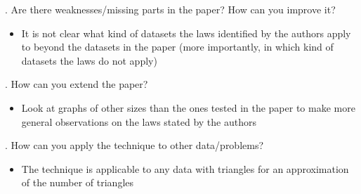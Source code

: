 \documentclass[12pt]{article}
\begin{document}
. Are there weaknesses/missing parts in the paper? How can you improve it?

\begin{itemize}
    \item It is not clear what kind of datasets the laws identified by the authors apply to beyond the datasets in the paper (more importantly, in which kind of datasets the laws do not apply)
\end{itemize}

. How can you extend the paper?

\begin{itemize}
    \item Look at graphs of other sizes than the ones tested in the paper to make more general observations on the laws stated by the authors
\end{itemize}

. How can you apply the technique to other data/problems?

\begin{itemize}
    \item The technique is applicable to any data with triangles for an approximation of the number of triangles
\end{itemize}
\end{document}
